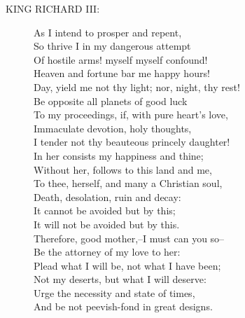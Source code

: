 \documentclass{article}
\begin{document}
\begin{description}
\item[KING RICHARD III:] 
\hspace{1pt}As I intend to prosper and repent,\\
\hspace{1pt}So thrive I in my dangerous attempt\\
\hspace{1pt}Of hostile arms! myself myself confound!\\
\hspace{1pt}Heaven and fortune bar me happy hours!\\
\hspace{1pt}Day, yield me not thy light; nor, night, thy rest!\\
\hspace{1pt}Be opposite all planets of good luck\\
\hspace{1pt}To my proceedings, if, with pure heart's love,\\
\hspace{1pt}Immaculate devotion, holy thoughts,\\
\hspace{1pt}I tender not thy beauteous princely daughter!\\
\hspace{1pt}In her consists my happiness and thine;\\
\hspace{1pt}Without her, follows to this land and me,\\
\hspace{1pt}To thee, herself, and many a Christian soul,\\
\hspace{1pt}Death, desolation, ruin and decay:\\
\hspace{1pt}It cannot be avoided but by this;\\
\hspace{1pt}It will not be avoided but by this.\\
\hspace{1pt}Therefore, good mother,--I must can you so--\\
\hspace{1pt}Be the attorney of my love to her:\\
\hspace{1pt}Plead what I will be, not what I have been;\\
\hspace{1pt}Not my deserts, but what I will deserve:\\
\hspace{1pt}Urge the necessity and state of times,\\
\hspace{1pt}And be not peevish-fond in great designs.\\
\end{description}
\end{document}
